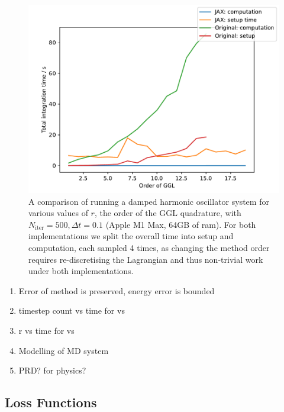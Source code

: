 \begin{figure}[t]
  \includegraphics[width=\columnwidth]{figures/dho_r_runtime_linear.pdf}
  \caption{A comparison of running a damped harmonic oscillator system for various values of $r$, the order of the GGL quadrature, with $N_{\mathrm{iter}} = 500, \Delta t = 0.1$ (Apple M1 Max, 64GB of ram).
	For both implementations we split the overall time into setup and computation, each sampled 4 times, as changing the method order requires re-discretising the Lagrangian and thus non-trivial work under both implementations.}
\end{figure}


\begin{enumerate}
	\item Error of method is preserved, energy error is bounded
	\item timestep count vs time for \orgimpl vs \updimpl
	\item r vs time for \orgimpl vs \updimpl
	\item Modelling of MD system
	\item PRD? for physics?
\end{enumerate}


\subsection{Loss Functions}


